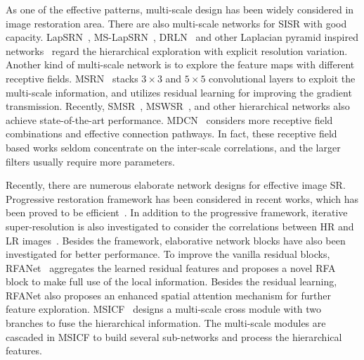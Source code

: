 \documentclass[manuscript,screen]{acmart}
\begin{document}
As one of the effective patterns, multi-scale design has been widely considered in image restoration area. There are also multi-scale networks for SISR with good capacity. LapSRN~\cite{lapsrn_cvpr2017}, MS-LapSRN~\cite{lapsrn_pami2019}, DRLN~\cite{drln_pami2020} and other Laplacian pyramid inspired networks~\cite{laplacian_tnnls2020} regard the hierarchical exploration with explicit resolution variation. Another kind of multi-scale network is to explore the feature maps with different receptive fields. MSRN~\cite{msrn_eccv2018} stacks $3\times3$ and $5\times5$ convolutional layers to exploit the multi-scale information, and utilizes residual learning for improving the gradient transmission. Recently, SMSR~\cite{smsr_tgrs2020}, MSWSR~\cite{mswsr_jstsp2020}, and other hierarchical networks also achieve state-of-the-art performance. MDCN~\cite{mdcn_csvt2020} considers more receptive field combinations and effective connection pathways. In fact, these receptive field based works seldom concentrate on the inter-scale correlations, and the larger filters usually require more parameters.

Recently, there are numerous elaborate network designs for effective image SR. Progressive restoration framework has been considered in recent works, which has been proved to be efficient~\cite{survey_pami2021}. In addition to the progressive framework, iterative super-resolution is also investigated to consider the correlations between HR and LR images~\cite{survey_pami2021}. Besides the framework, elaborative network blocks have also been investigated for better performance. To improve the vanilla residual blocks, RFANet~\cite{rfanet_cvpr2020} aggregates the learned residual features and proposes a novel RFA block to make full use of the local information. Besides the residual learning, RFANet also proposes an enhanced spatial attention mechanism for further feature exploration. MSICF~\cite{msicf_sp2021} designs a multi-scale cross module with two branches to fuse the hierarchical information. The multi-scale modules are cascaded in MSICF to build several sub-networks and process the hierarchical features.
\end{document}

